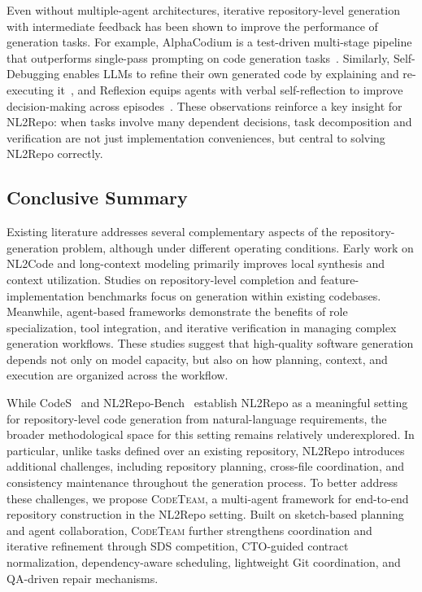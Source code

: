\documentclass[format=acmsmall, review=false, screen=true]{acmart}
\newcommand{\tool}{\textsc{CodeTeam}\xspace}
\begin{document}
Even without multiple-agent architectures, iterative repository-level generation with intermediate feedback has been shown to improve the performance of generation tasks. For example, AlphaCodium is a test-driven multi-stage pipeline that outperforms single-pass prompting on code generation tasks~\cite{Ridnik2024AlphaCodium}. Similarly, Self-Debugging enables LLMs to refine their own generated code by explaining and re-executing it~\cite{Chen2024SelfDebugging}, and Reflexion equips agents with verbal self-reflection to improve decision-making across episodes~\cite{Shinn2024Reflexion}. These observations reinforce a key insight for NL2Repo: when tasks involve many dependent decisions, task decomposition and verification are not just implementation conveniences, but central to solving NL2Repo correctly.

\subsection{Conclusive Summary}\label{subsec:conclusive-summary}
Existing literature addresses several complementary aspects of the repository-generation problem, although under different operating conditions. Early work on NL2Code and long-context modeling primarily improves local synthesis and context utilization. Studies on repository-level completion and feature-implementation benchmarks focus on generation within existing codebases. Meanwhile, agent-based frameworks demonstrate the benefits of role specialization, tool integration, and iterative verification in managing complex generation workflows. These studies suggest that high-quality software generation depends not only on model capacity, but also on how planning, context, and execution are organized across the workflow.

While CodeS~\cite{Zan2025CodeS} and NL2Repo-Bench~\cite{Ding2025NL2RepoBench} establish NL2Repo as a meaningful setting for repository-level code generation from natural-language requirements, the broader methodological space for this setting remains relatively underexplored. In particular, unlike tasks defined over an existing repository, NL2Repo introduces additional challenges, including repository planning, cross-file coordination, and consistency maintenance throughout the generation process. To better address these challenges, we propose \tool, a multi-agent framework for end-to-end repository construction in the NL2Repo setting. Built on sketch-based planning and agent collaboration, \tool further strengthens coordination and iterative refinement through SDS competition, CTO-guided contract normalization, dependency-aware scheduling, lightweight Git coordination, and QA-driven repair mechanisms.
\end{document}

